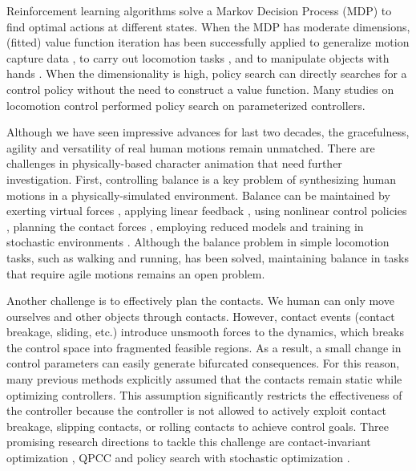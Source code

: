 Reinforcement learning algorithms solve a Markov Decision Process (MDP) to find optimal actions at different states. When the MDP has moderate dimensions, (fitted) value function iteration has been successfully applied to generalize motion capture data \cite{Treuille:2007:NCA,Levine:2012:CCC}, to carry out locomotion tasks \cite{Coros:2009:RTC}, and to manipulate objects with hands \cite{Multifinger2013}. When the dimensionality is high, policy search \cite{Ng:2000:PPS} can directly searches for a control policy without the need to construct a value function. Many studies on locomotion control \cite{Yin08,Wang:2009,Coros:2011,Wang:2012,Geijtenbeek:2013} performed policy search on parameterized controllers. 

Although we have seen impressive advances for last two decades, the gracefulness, agility and versatility of real human motions remain unmatched. There are challenges in physically-based character animation that need further investigation. First, controlling balance is a key problem of synthesizing human motions in a physically-simulated environment. Balance can be maintained by exerting virtual forces \cite{Pratt2001,Coros2010}, applying linear feedback \cite{Laszlo:1996,Yin:2007,daSilva:2008,Coros2010}, using nonlinear control policies \cite{Muico:2009}, planning the contact forces \cite{Muico:2009,Tan:2012}, employing reduced models \cite{Tsai:2010,Kwon:2010,Mordatch:2010:RPL,Coros2010,Ye:2010} and training in stochastic environments \cite{Wang:2010}. Although the balance problem in simple locomotion tasks, such as walking and running, has been solved, maintaining balance in tasks that require agile motions remains an open problem. 

Another challenge is to effectively plan the contacts. We human can only move ourselves and other objects through contacts. However, contact events (contact breakage, sliding, etc.) introduce unsmooth forces to the dynamics, which breaks the control space into fragmented feasible regions. As a result, a small change in control parameters can easily generate bifurcated consequences. For this reason, many previous methods
explicitly assumed that the contacts remain static
\cite{Abe:2007,Jain:2009,Kim:2011:DCO} while optimizing controllers. This assumption significantly
restricts the effectiveness of the controller because the controller is not allowed to actively exploit contact
breakage, slipping contacts, or rolling contacts to achieve control
goals. Three promising research directions to tackle this challenge are contact-invariant optimization \cite{Mordatch:2012,Mordatch:2013}, QPCC \cite{Tan:2012} and policy search with stochastic optimization \cite{Wu:2010:TAB,Wang:2010,Mordatch:2010:RPL}.

